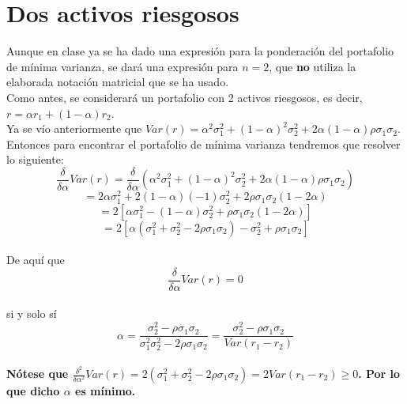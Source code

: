\documentclass[12pts]{extarticle}
\author{}
\date{}
\begin{document}
 
\section{Dos activos riesgosos}
Aunque en clase ya se ha dado una expresión para la ponderación del portafolio de mínima varianza, se dará una expresión para $n=2$, que \textbf{no} utiliza la elaborada notación matricial que se ha usado. \\ 
Como antes, se considerará un portafolio con 2 activos riesgosos, es decir,  $r=\alpha r_1 +(1-\alpha)r_2$. \\
 Ya se vío anteriormente que $Var(r)=\alpha^2\sigma_1^2 + (1-\alpha)^2 \sigma_2 ^2 +2\alpha (1-\alpha)\rho \sigma_1 \sigma_2$. \\
 Entonces para encontrar el portafolio de mínima varianza tendremos que resolver lo siguiente: 
$$\frac{\delta}{\delta\alpha} Var(r)= \frac{\delta}{\delta\alpha} (\alpha^2 \sigma_1^2 + (1-\alpha)^2 \sigma_2^2 +2\alpha (1-\alpha)\rho\sigma_1\sigma_2)$$ 
 $$=2\alpha\sigma_1^2 +2(1-\alpha)(-1)\sigma_2^2 + 2\rho\sigma_1\sigma_2(1-2\alpha)$$ $$=2[\alpha\sigma_1^2 -(1-\alpha)\sigma_2^2 + \rho\sigma_1\sigma_2(1-2\alpha)]$$ $$=2[\alpha(\sigma_1^2 +\sigma_2^2 -2\rho\sigma_1\sigma_2) -\sigma_2^2 +\rho\sigma_1\sigma_2]$$
\\ De aquí que $$\frac{\delta}{\delta\alpha} Var(r)=0$$ \\ si y solo sí $$\alpha=\frac{\sigma_2^2 -\rho \sigma_1 \sigma_2}{\sigma_1^2  \sigma_2^2 -2\rho \sigma_1 \sigma_2} = \frac{\sigma_2^2 -\rho\sigma_1\sigma_2}{Var(r_1 - r_2)}$$
\\ \textbf{ Nótese que $\frac{\delta^2}{\delta\alpha^2} Var(r) = 2(\sigma_1^2 +\sigma_2^2 -2\rho\sigma_1\sigma_2) = 2Var(r_1 - r_2) \geq 0$. Por lo que dicho $\alpha$ es mínimo.} 
\\ 
\end{document}

